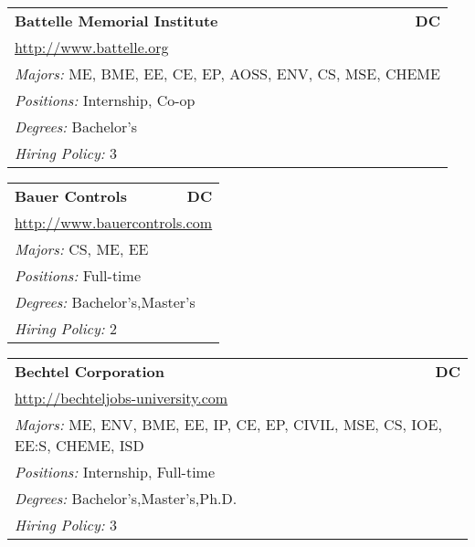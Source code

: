 \documentclass[twoside]{article}
\begin{document}
\begin{center}
\begin{multicols}{3}
\begin{FlushLeft}
\begin{minipage}{.9\columnwidth}
\end{minipage}
 
\begin{minipage}{.9\columnwidth}\begin{tabularx}{.95\columnwidth}{Xr}
                 {\Large\bf Battelle Memorial Institute} & {\Large\bf DC}\\
    \multicolumn{2}{p{.95\columnwidth}}{\url{http://www.battelle.org}}\\
    \multicolumn{2}{p{.95\columnwidth}}{\emph{Majors:} ME, BME, EE, CE, EP, AOSS, ENV, CS, MSE, CHEME}\\
    \multicolumn{2}{p{.95\columnwidth}}{\emph{Positions:} Internship, Co-op}\\
    \multicolumn{2}{p{.95\columnwidth}}{\emph{Degrees:} Bachelor's}\\
    \multicolumn{2}{p{.95\columnwidth}}{\emph{Hiring Policy:} 3}\\
    \end{tabularx}
    
\end{minipage}
 
\begin{minipage}{.9\columnwidth}\begin{tabularx}{.95\columnwidth}{Xr}
                 {\Large\bf Bauer Controls} & {\Large\bf DC}\\
    \multicolumn{2}{p{.95\columnwidth}}{\url{http://www.bauercontrols.com}}\\
    \multicolumn{2}{p{.95\columnwidth}}{\emph{Majors:} CS, ME, EE}\\
    \multicolumn{2}{p{.95\columnwidth}}{\emph{Positions:} Full-time}\\
    \multicolumn{2}{p{.95\columnwidth}}{\emph{Degrees:} Bachelor's,Master's}\\
    \multicolumn{2}{p{.95\columnwidth}}{\emph{Hiring Policy:} 2}\\
    \end{tabularx}
    
\end{minipage}
 
\begin{minipage}{.9\columnwidth}\begin{tabularx}{.95\columnwidth}{Xr}
                 {\Large\bf Bechtel Corporation} & {\Large\bf DC}\\
    \multicolumn{2}{p{.95\columnwidth}}{\url{http://bechteljobs-university.com}}\\
    \multicolumn{2}{p{.95\columnwidth}}{\emph{Majors:} ME, ENV, BME, EE, IP, CE, EP, CIVIL, MSE, CS, IOE, EE:S, CHEME, ISD}\\
    \multicolumn{2}{p{.95\columnwidth}}{\emph{Positions:} Internship, Full-time}\\
    \multicolumn{2}{p{.95\columnwidth}}{\emph{Degrees:} Bachelor's,Master's,Ph.D.}\\
    \multicolumn{2}{p{.95\columnwidth}}{\emph{Hiring Policy:} 3}\\
    \end{tabularx}
    

\end{minipage}
\end{FlushLeft}
\end{multicols}
\end{center}
\end{document}
